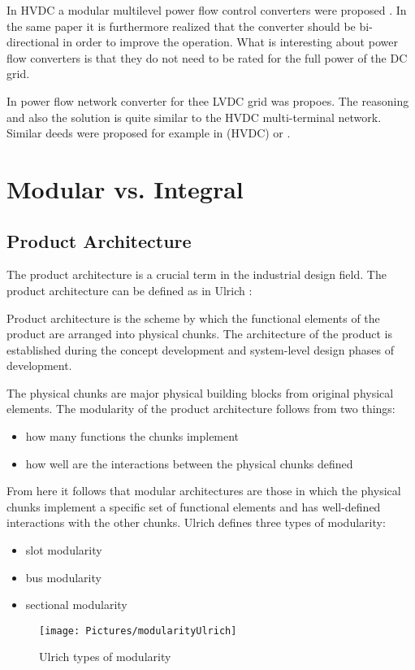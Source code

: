 \documentclass[]{scrartcl}
\newenvironment{definition}[1][Definition]{\begin{trivlist}
		\item[\hskip \labelsep {\bfseries #1}]}{\end{trivlist}}
\begin{document}
In HVDC a modular multilevel power flow control converters were proposed \cite{Xu2014}. In the same paper it is furthermore realized that the converter should be bi-directional in order to improve the operation. What is interesting about power flow converters is that they do not need to be rated for the full power of the DC grid. 

In \cite{Mackay2015}  power flow network converter for thee LVDC grid was propoes. The reasoning and also the solution is quite similar to the HVDC multi-terminal network. Similar deeds were proposed for example in \cite{Mu2012}(HVDC) or \cite{Mohamed}. 



\newpage
\section{Modular vs. Integral}

\subsection{Product Architecture}
The product architecture is a crucial term in the industrial design field. The product architecture can be defined as in Ulrich \cite{Ulrich2004}:
\begin{definition}
Product architecture is the scheme by which the functional elements of the product are arranged into physical chunks. The architecture of the product is established during the concept development and system-level design phases of development. 
\end{definition}
	
The physical chunks are major physical building blocks from original physical elements. The modularity of the product architecture follows from two things:
\begin{itemize}
	\item how many functions the chunks implement
	\item how well are the interactions between the physical chunks defined
\end{itemize}
		
		
From here it follows that modular architectures are those in which the physical chunks implement a specific set of functional elements and has well-defined interactions with the other chunks. Ulrich defines three types of modularity:
\begin{itemize}
	\item slot modularity
	\item bus modularity
	\item sectional modularity
\end{itemize}
\begin{figure}[h!]
	\centering
	\texttt{[image: Pictures/modularityUlrich]}
	\caption{Ulrich types of modularity}
	\label{fig:modularityulrich}
	\end{figure}
				
\end{document}
